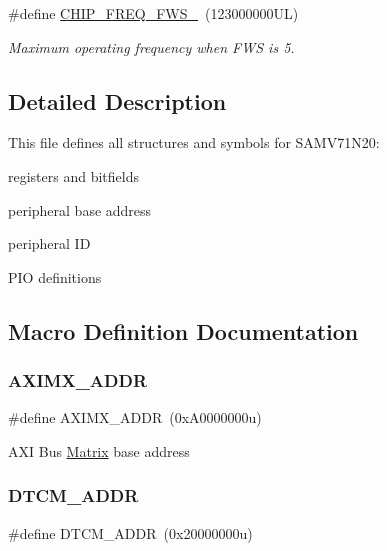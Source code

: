 \begin{DoxyCompactItemize}
\mbox{\label{group__SAMV71N20__definitions_ga3b66824f858591135877b369f98d48a5}} 
\#define \mbox{\hyperlink{group__SAMV71N20__definitions_ga3b66824f858591135877b369f98d48a5}{C\+H\+I\+P\+\_\+\+F\+R\+E\+Q\+\_\+\+F\+W\+S\+\_}}~(123000000\+U\+L)
\begin{DoxyCompactList}\small\item\em Maximum operating frequency when F\+WS is 5. \end{DoxyCompactList}\end{DoxyCompactItemize}


\subsection{Detailed Description}
This file defines all structures and symbols for S\+A\+M\+V71\+N20\+:
\begin{DoxyItemize}
\item registers and bitfields
\item peripheral base address
\item peripheral ID
\item P\+IO definitions 
\end{DoxyItemize}

\subsection{Macro Definition Documentation}
\mbox{\label{group__SAMV71N20__definitions_ga2fb7cc681bf5e7fbce5e3635b72a330a}} 
\subsubsection{\texorpdfstring{AXIMX\_ADDR}{AXIMX\_ADDR}}
{\footnotesize\ttfamily \#define A\+X\+I\+M\+X\+\_\+\+A\+D\+DR~(0x\+A0000000u)}

A\+XI Bus \mbox{\hyperlink{structMatrix}{Matrix}} base address \mbox{\label{group__SAMV71N20__definitions_ga26626a425f7ebb3a0c2dbc276f0d9f78}} 
\subsubsection{\texorpdfstring{DTCM\_ADDR}{DTCM\_ADDR}}
{\footnotesize\ttfamily \#define D\+T\+C\+M\+\_\+\+A\+D\+DR~(0x20000000u)}

